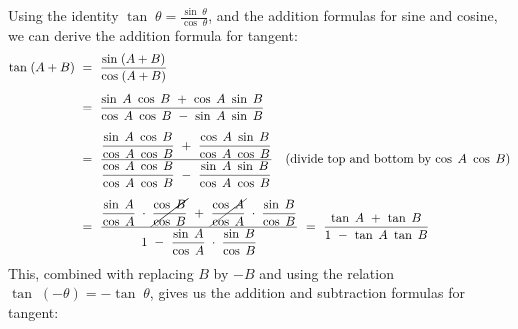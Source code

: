 Using the identity $\tan\;\theta = \frac{\sin\;\theta}{\cos\;\theta}$, and the addition formulas
for sine and cosine, we can derive the addition formula for tangent:
\begin{align*}
 \tan\;(A+B) ~&=~ \frac{\sin\;(A+B)}{\cos\;(A+B)}\\[5pt]
 &=~ \frac{\sin\;A ~ \cos\;B ~+~ \cos\;A ~ \sin\;B}{\cos\;A ~ \cos\;B ~-~ \sin\;A ~ \sin\;B}\\[5pt]
 &=~ \frac{\dfrac{\sin\;A ~ \cos\;B}{\cos\;A ~ \cos\;B} ~+~
  \dfrac{\cos\;A ~ \sin\;B}{\cos\;A ~ \cos\;B}}{\dfrac{\cos\;A ~ \cos\;B}{\cos\;A ~ \cos\;B}
  ~-~ \dfrac{\sin\;A ~ \sin\;B}{\cos\;A ~ \cos\;B}}\quad\text{(divide top and bottom by
  $\cos\;A ~ \cos\;B$)}\\[5pt]
 &=~ \frac{\dfrac{\sin\;A}{\cos\;A} \;\cdot\; \cancel{\dfrac{\cos\;B}{\cos\;B}} ~+~
  \cancel{\dfrac{\cos\;A}{\cos\;A}} \;\cdot\; \dfrac{\sin\;B}{\cos\;B}}{1 ~-~
  \dfrac{\sin\;A}{\cos\;A} \;\cdot\; \dfrac{\sin\;B}{\cos\;B}}
  ~=~ \frac{\tan\;A ~+~ \tan\;B}{1 ~-~ \tan\;A ~ \tan\;B}
\end{align*}
This, combined with replacing $B$ by $-B$ and using the relation $\tan\;(-\theta) = -\tan\;\theta$,
gives us the addition and subtraction formulas for tangent:

\begin{center}\end{center}

